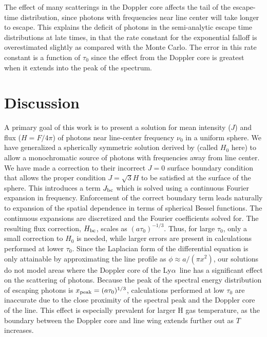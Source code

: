 \documentclass{aastex63}
\newcommand\lya{Ly$\alpha$\ }
\begin{document}
The effect of many scatterings in the Doppler core affects the tail of the escape-time distribution, since photons with frequencies near line center will take longer to escape. This explains the deficit of photons in the semi-analytic escape time distributions at late times, in that the rate constant for the exponential falloff is overestimated slightly as compared with the Monte Carlo. The error in this rate constant is a function of $\tau_0$ since the effect from the Doppler core is greatest when it extends into the peak of the spectrum.

\section{Discussion}

A primary goal of this work is to present a solution for mean intensity ($J$) and flux ($H = F/4\pi$) of photons near line-center frequency $\nu_0$ in a uniform sphere. We have generalized a spherically symmetric solution derived by \cite{2006ApJ...649...14D} (called $H_0$ here) to allow a monochromatic source of photons with frequencies away from line center. We have made a correction to their incorrect $J=0$ surface boundary condition that allows the proper condition $J=\sqrt{3}H$ to be satisfied at the surface of the sphere. This introduces a term $J_{\rm bc}$ which is solved using a continuous Fourier expansion in frequency. Enforcement of the correct boundary term leads naturally to expansion of the spatial dependence in terms of spherical Bessel functions. The continuous expansions are discretized and the Fourier coefficients solved for. The resulting flux correction, $H_{\rm bc}$, scales as $(a\tau_0)^{-1/3}$. Thus, for large $\tau_0$, only a small correction to $H_0$ is needed, while larger errors are present in calculations performed at lower $\tau_0$. Since the Laplacian form of the differential equation is only attainable by approximating the line profile as $\phi \approx a/(\pi x^2)$, our solutions do not model areas where the Doppler core of the \lya line has a significant effect on the scattering of photons. Because the peak of the spectral energy distribution of escaping photons is $x_{\rm peak} = (a\tau_0)^{1/3}$, calculations performed at low $\tau_0$ are inaccurate due to the close proximity of the spectral peak and the Doppler core of the line. This effect is especially prevalent for larger H gas temperature, as the boundary between the Doppler core and line wing extends further out as $T$ increases.
\end{document}
